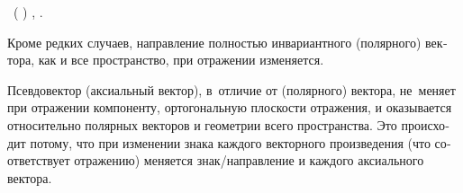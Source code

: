 \begin{figure}[htb!]
\begin{center}

\end{center}
\vspace{-1.2em}\caption{}\label{fig:leftrightspirals}
\vspace{-1.1em}
\end{figure}

~( )\ru{\:---}   
,
 
.

{\small%
\begin{otherlanguage}{russian}
Кроме редких случаев, направление полностью инвариантного (полярного) вектора, как и все пространство, при отражении изменяется.

Псевдовектор (аксиальный вектор), в~отличие от (полярного) вектора, не~меняет при отражении компоненту, ортогональную плоскости отражения, и оказывается  относительно полярных векторов и геометрии всего пространства. Это происходит потому, что при изменении знака каждого векторного произведения (что соответствует отражению) меняется знак/направление и каждого аксиального вектора.
\end{otherlanguage}%
\par}

